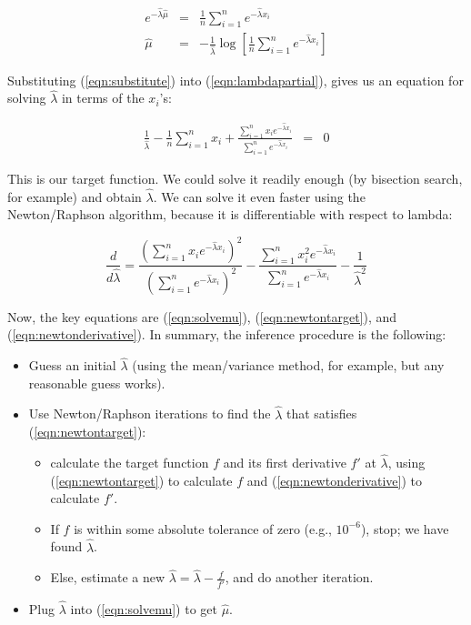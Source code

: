 \begin{eqnarray}
e^{-\hat{\lambda} \hat{\mu}} & = & \frac{1}{n} \sum_{i=1}^{n} e^{-\hat{\lambda} x_i} 
\label{eqn:substitute}\\
\hat{\mu} & = & - \frac{1}{\hat{\lambda}} 
	\log \left[ \frac{1}{n} \sum_{i=1}^{n} e^{-\hat{\lambda} x_i} \right]
\label{eqn:solvemu}
\end{eqnarray}

Substituting (\ref{eqn:substitute}) into (\ref{eqn:lambdapartial}),
gives us an equation for solving $\hat{\lambda}$ in terms of the
$x_i$'s:

\begin{eqnarray}
\frac{1}{\hat{\lambda}} - \frac{1}{n} \sum_{i=1}^{n} x_i +
\frac{\sum_{i=1}^{n} x_i e^{-\hat{\lambda} x_i}}
     {\sum_{i=1}^{n} e^{-\hat{\lambda} x_i}} 
& = & 0
\label{eqn:newtontarget}
\end{eqnarray}

This is our target function. We could solve it readily enough (by
bisection search, for example) and obtain $\hat{\lambda}$. We can
solve it even faster using the Newton/Raphson algorithm, because it is
differentiable with respect to lambda:

\begin{equation}
\frac{d}{d\hat{\lambda}} = 
\frac{\left( \sum_{i=1}^{n} x_i e^{-\hat{\lambda} x_i} \right)^2 } 
     {\left( \sum_{i=1}^{n} e^{-\hat{\lambda} x_i}     \right)^2 }
-
\frac{\sum_{i=1}^{n} x_i^2 e^{-\hat{\lambda} x_i}}
     {\sum_{i=1}^{n} e^{-\hat{\lambda} x_i}}
-
\frac{1}{\hat{\lambda}^2}
\label{eqn:newtonderivative}
\end{equation}

Now, the key equations are (\ref{eqn:solvemu}),
(\ref{eqn:newtontarget}), and (\ref{eqn:newtonderivative}). In
summary, the inference procedure is the following:

\begin{itemize}
\item Guess an initial $\hat{\lambda}$ (using the mean/variance
  method, for example, but any reasonable guess works).
\item Use Newton/Raphson iterations to find the $\hat{\lambda}$ that satisfies
      (\ref{eqn:newtontarget}):
	\begin{itemize}
	\item calculate the target function $f$ and 
         its first derivative $f'$ at $\hat{\lambda}$, using 
	(\ref{eqn:newtontarget}) to calculate $f$ and 
	(\ref{eqn:newtonderivative}) to calculate $f'$.
	\item If $f$ is within some absolute tolerance of zero 
	(e.g., $10^{-6}$), stop; we have found $\hat{\lambda}$.
	\item Else, estimate a new $\hat{\lambda} = \hat{\lambda} - \frac{f}{f'}$,
	  and do another iteration.
	\end{itemize}
\item Plug $\hat{\lambda}$ into (\ref{eqn:solvemu}) to get $\hat{\mu}$.
\end{itemize}

